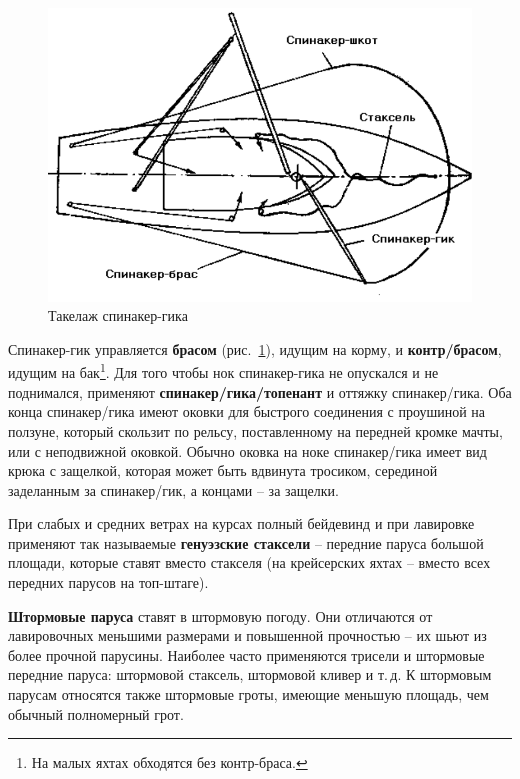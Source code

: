 \documentclass[a4paper, 12pt, twoside, final]{scrbook}
\begin{document}
\begin{figure}[htbp] %
   \centering
   \includegraphics{pics/48_takelazh_spinaker-gika} 
   \caption{Такелаж спинакер-гика}
   \label{fig:48}
\end{figure}

Спинакер-гик управляется \textbf{брасом} (рис.~\ref{fig:48}), идущим на корму, и \textbf{контр\-/брасом}, идущим на бак\footnote{На малых яхтах обходятся без контр-браса.}. Для того чтобы нок спинакер-гика не опускался и не поднимался, применяют \textbf{спинакер\-/гика\-/топенант} и оттяжку спинакер\-/гика. Оба конца спинакер\-/гика имеют оковки для быстрого соединения с проушиной на ползуне, который скользит по рельсу, поставленному на передней кромке мачты, или с неподвижной оковкой. Обычно оковка на ноке спинакер\-/гика имеет вид крюка с защелкой, которая может быть вдвинута тросиком, серединой заделанным за спинакер\-/гик, а концами \--- за защелки.

При слабых и средних ветрах на курсах полный бейдевинд и при лавировке применяют так называемые \textbf{генуэзские стаксели} \--- передние паруса большой площади, которые ставят вместо стакселя (на крейсерских яхтах \--- вместо всех передних парусов на топ-штаге).

\textbf{Штормовые паруса} ставят в штормовую погоду. Они отличаются от лавировочных меньшими размерами и повышенной прочностью \--- их шьют из более прочной парусины. Наиболее часто применяются трисели и штормовые передние паруса: штормовой стаксель, штормовой кливер и т.\,д. К штормовым парусам относятся также штормовые гроты, имеющие меньшую площадь, чем обычный полномерный грот.
\end{document}
